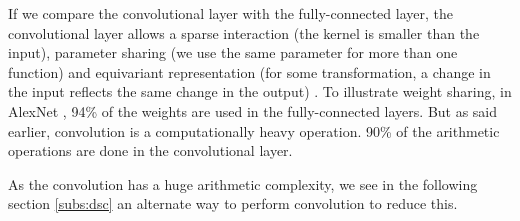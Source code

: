 If we compare the convolutional layer with the fully-connected layer, the convolutional layer allows a sparse interaction (the kernel is smaller than the input), parameter sharing (we use the same parameter for more than one function) and equivariant representation (for some transformation, a change in the input reflects the same change in the output) \cite{goodfellow_deep_2016}. To illustrate weight sharing, in AlexNet \cite{krizhevsky_imagenet_2012}, 94\% of the weights are used in the fully-connected layers. But as said earlier, convolution is a computationally heavy operation. 90\% of the arithmetic operations are done in the convolutional layer.

As the convolution has a huge arithmetic complexity, we see in the following section \ref{subs:dsc} an alternate way to perform convolution to reduce this.
